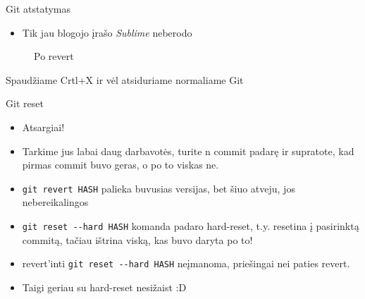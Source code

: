 \documentclass[11pt,xcolor=table]{beamer}
\begin{document}

\begin{frame}[fragile]{Git atstatymas}
\begin{itemize}
\item Tik jau blogojo įrašo \textit{Sublime} neberodo
\end{itemize}
\begin{figure}
\caption{Po revert}
\end{figure}
Spaudžiame Crtl+X ir vėl atsiduriame normaliame Git
\end{frame}



\begin{frame}[fragile]{Git reset}
\begin{itemize}
\item Atsargiai! 
\item Tarkime jus labai daug darbavotės, turite n commit padarę ir supratote, kad pirmas commit buvo geras, o po to viskas ne.
\item \colorbox{listinggray}{\lstinline|git revert HASH|} palieka buvusias versijas, bet šiuo atveju, jos nebereikalingos
\item \colorbox{listinggray}{\lstinline|git reset --hard HASH|} komanda padaro hard-reset, t.y. resetina į pasirinktą commitą, tačiau ištrina viską, kas buvo daryta po to! 
\item revert'inti \colorbox{listinggray}{\lstinline|git reset --hard HASH|} neįmanoma, priešingai nei paties revert.
\item Taigi geriau su hard-reset nesižaist :D
\end{itemize}
\end{frame}

\end{document}
